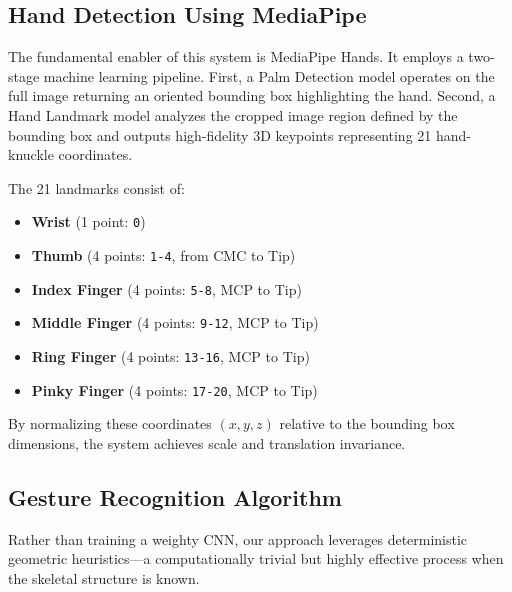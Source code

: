 \documentclass[conference]{IEEEtran}
\begin{document}
\subsection{Hand Detection Using MediaPipe}
The fundamental enabler of this system is MediaPipe Hands. It employs a two-stage machine learning pipeline. First, a Palm Detection model operates on the full image returning an oriented bounding box highlighting the hand. Second, a Hand Landmark model analyzes the cropped image region defined by the bounding box and outputs high-fidelity 3D keypoints representing 21 hand-knuckle coordinates.

The 21 landmarks consist of:
\begin{itemize}
    \item \textbf{Wrist} (1 point: \texttt{0})
    \item \textbf{Thumb} (4 points: \texttt{1-4}, from CMC to Tip)
    \item \textbf{Index Finger} (4 points: \texttt{5-8}, MCP to Tip)
    \item \textbf{Middle Finger} (4 points: \texttt{9-12}, MCP to Tip)
    \item \textbf{Ring Finger} (4 points: \texttt{13-16}, MCP to Tip)
    \item \textbf{Pinky Finger} (4 points: \texttt{17-20}, MCP to Tip)
\end{itemize}

By normalizing these coordinates $(x, y, z)$ relative to the bounding box dimensions, the system achieves scale and translation invariance.

\subsection{Gesture Recognition Algorithm}
Rather than training a weighty CNN, our approach leverages deterministic geometric heuristics---a computationally trivial but highly effective process when the skeletal structure is known.
\end{document}
